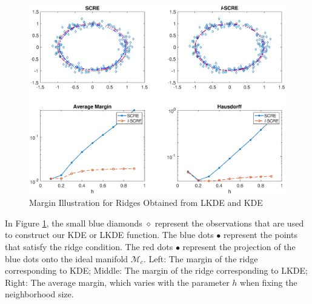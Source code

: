 \documentclass[aos,preprint]{imsart}
\theoremstyle{remark}
\begin{document}
\begin{figure} %
   \includegraphics[width=\linewidth]{circle8.eps} 
   \caption{Margin Illustration for Ridges Obtained from LKDE and KDE}
   \label{fig:circle6}
\end{figure}
In Figure \ref{fig:circle6}, the small blue diamonds $\diamond$ represent the observations that are used to construct our KDE or LKDE function. The blue dots $\bullet$ represent the points that satisfy the ridge condition. The red dots $\bullet$ represent the projection of the blue dots onto the ideal manifold ${\mathcal M}_c$. Left: The margin of the ridge corresponding to KDE; Middle: The margin of the ridge corresponding to LKDE; Right: The average margin, which varies with the parameter $h$ when fixing the neighborhood size.

\begin{table}

\caption{The Margin of the Computed Ridge with $\mathcal M$ Varies with $h$ for KDE and LKDE}
\label{table:margin}
\end{table}
\end{document}

